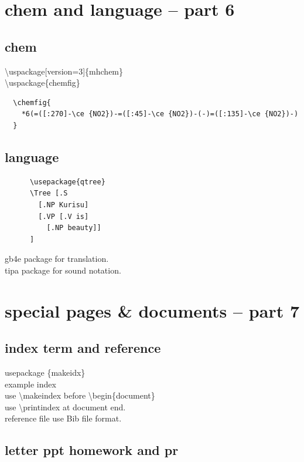 \documentclass[11pt,a4paper]{article}
\begin{document}
\section{chem and language -- part 6}{
  \subsection{chem}{
    \textbackslash{}uspackage[version=3]\{mhchem\} \\
    \textbackslash{}uspackage\{chemfig\} \\    
                  {
\begin{verbatim}
  \chemfig{
    *6(=([:270]-\ce {NO2})-=([:45]-\ce {NO2})-(-)=([:135]-\ce {NO2})-)
  }
\end{verbatim}
                  }
  }
  
  \subsection{language}{
    {
\begin{verbatim}
      \usepackage{qtree}
      \Tree [.S
        [.NP Kurisu]
        [.VP [.V is]
          [.NP beauty]]
      ]
\end{verbatim}
    }
    gb4e package for translation. \\
    tipa package for sound notation.
  }
}

\section{special pages \& documents -- part 7}{
  \subsection{index term and reference}{
    usepackage \{makeidx\}\\
    example index \\
    use \textbackslash{}makeindex before \textbackslash{}begin\{document\} \\
    use \textbackslash{}printindex at document end. \\
    reference file use Bib file format.
  }
  \subsection{letter ppt homework and pr}{
    
  }
}

\printindex %
\end{document}
